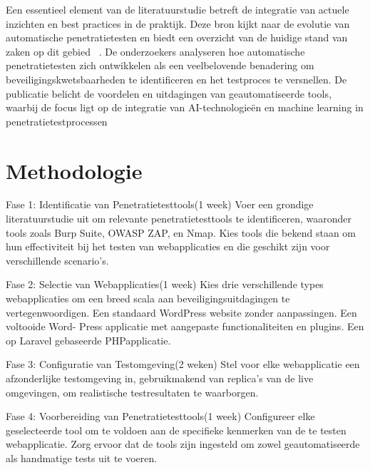 Een essentieel element van de literatuurstudie
betreft de integratie van actuele inzichten en
best practices in de praktijk. Deze bron kijkt naar
de evolutie van automatische penetratietesten en
biedt een overzicht van de huidige stand van zaken
op dit gebied ~\autocite{AbuDabaseh2018}. De onderzoekers analyseren hoe automatische
penetratietesten zich ontwikkelen als een
veelbelovende benadering om beveiligingskwetsbaarheden
te identificeren en het testproces te
versnellen. De publicatie belicht de voordelen en
uitdagingen van geautomatiseerde tools, waarbij
de focus ligt op de integratie van AI-technologieën
en machine learning in penetratietestprocessen

\section{Methodologie}%
\label{sec:methodologie}

Fase 1: Identificatie van Penetratietesttools(1
week) Voer een grondige literatuurstudie uit om
relevante penetratietesttools te identificeren, waaronder
tools zoals Burp Suite, OWASP ZAP, en Nmap.
Kies tools die bekend staan om hun effectiviteit bij
het testen van webapplicaties en die geschikt zijn
voor verschillende scenario's.

Fase 2: Selectie van Webapplicaties(1 week)
Kies drie verschillende types webapplicaties om
een breed scala aan beveiligingsuitdagingen te
vertegenwoordigen. Een standaard WordPress
website zonder aanpassingen. Een voltooide Word-
Press applicatie met aangepaste functionaliteiten
en plugins. Een op Laravel gebaseerde PHPapplicatie.

Fase 3: Configuratie van Testomgeving(2 weken)
Stel voor elke webapplicatie een afzonderlijke
testomgeving in, gebruikmakend van replica's
van de live omgevingen, om realistische testresultaten
te waarborgen.

Fase 4: Voorbereiding van Penetratietesttools(1
week) Configureer elke geselecteerde tool om te
voldoen aan de specifieke kenmerken van de te
testen webapplicatie. Zorg ervoor dat de tools zijn
ingesteld om zowel geautomatiseerde als handmatige
tests uit te voeren.


